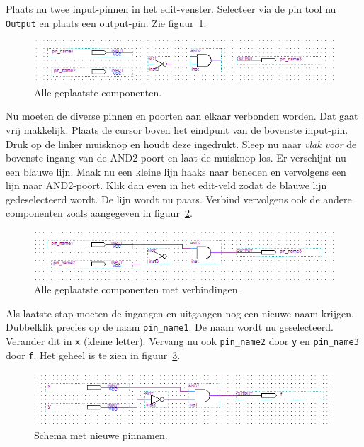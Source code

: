 \documentclass[a4paper,12pt,fleqn,twoside]{book}
\def\tutpicscale{0.455}
\newcommand{\naam}[1]{\texttt{#1}}
\begin{document}
Plaats nu twee input-pinnen in het edit-venster. Selecteer via de pin tool nu
\naam{Output} en plaats een output-pin.
Zie figuur~\ref{fig:026schematicnowires}.

\begin{figure}[H]
\centering
\includegraphics[scale=\tutpicscale]{026schematicnowires}
\caption{Alle geplaatste componenten.}
\label{fig:026schematicnowires}
\end{figure}

Nu moeten de diverse pinnen en poorten aan elkaar verbonden worden. Dat gaat
vrij makkelijk. Plaats de cursor boven het eindpunt van de bovenste input-pin.
Druk op de linker muisknop en houdt deze ingedrukt. Sleep nu naar \textsl{vlak
voor} de bovenste ingang van de AND2-poort en laat de muisknop los. Er
verschijnt nu een blauwe lijn. Maak nu een kleine lijn haaks naar beneden en 
vervolgens een lijn naar AND2-poort. Klik dan even in het edit-veld zodat de
blauwe lijn gedeselecteerd wordt. De lijn wordt nu paars. Verbind vervolgens
ook de andere componenten zoals aangegeven in figuur~\ref{fig:027withwires}.

\begin{figure}[H]
\centering
\includegraphics[scale=\tutpicscale]{027withwires}
\caption{Alle geplaatste componenten met verbindingen.}
\label{fig:027withwires}
\end{figure}

Als laatste stap moeten de ingangen en uitgangen nog een nieuwe naam krijgen.
Dubbelklik precies op de naam \naam{pin\_name1}. De naam wordt nu
geselecteerd. Verander dit in \naam{x} (kleine letter). Vervang nu ook
\naam{pin\_name2} door \naam{y} en \naam{pin\_name3} door \naam{f}. Het geheel
is te zien in figuur~\ref{fig:028withpinnames}. 

\begin{figure}[H]
\centering
\includegraphics[scale=\tutpicscale]{028withpinnames}
\caption{Schema met nieuwe pinnamen.}
\label{fig:028withpinnames}
\end{figure}
\end{document}
